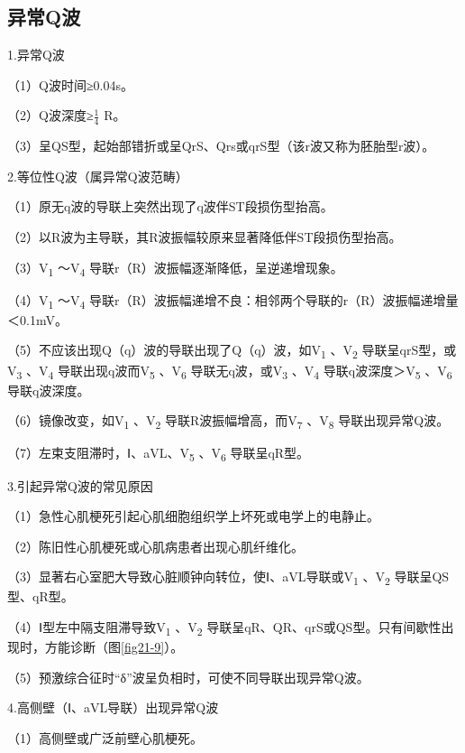 \protect\hypertarget{text00009.htmlux5cux23subid45}{}{}

\subsection{异常Q波}

1.异常Q波

（1）Q波时间≥0.04s。

（2）Q波深度≥$\frac{1}{4}$ R。

（3）呈QS型，起始部错折或呈QrS、Qrs或qrS型（该r波又称为胚胎型r波）。

2.等位性Q波（属异常Q波范畴）

（1）原无q波的导联上突然出现了q波伴ST段损伤型抬高。

（2）以R波为主导联，其R波振幅较原来显著降低伴ST段损伤型抬高。

（3）V\textsubscript{1} ～V\textsubscript{4}
导联r（R）波振幅逐渐降低，呈逆递增现象。

（4）V\textsubscript{1} ～V\textsubscript{4}
导联r（R）波振幅递增不良：相邻两个导联的r（R）波振幅递增量＜0.1mV。

（5）不应该出现Q（q）波的导联出现了Q（q）波，如V\textsubscript{1}
、V\textsubscript{2} 导联呈qrS型，或V\textsubscript{3}
、V\textsubscript{4} 导联出现q波而V\textsubscript{5}
、V\textsubscript{6} 导联无q波，或V\textsubscript{3}
、V\textsubscript{4} 导联q波深度＞V\textsubscript{5}
、V\textsubscript{6} 导联q波深度。

（6）镜像改变，如V\textsubscript{1} 、V\textsubscript{2}
导联R波振幅增高，而V\textsubscript{7} 、V\textsubscript{8}
导联出现异常Q波。

（7）左束支阻滞时，Ⅰ、aVL、V\textsubscript{5} 、V\textsubscript{6}
导联呈qR型。

3.引起异常Q波的常见原因

（1）急性心肌梗死引起心肌细胞组织学上坏死或电学上的电静止。

（2）陈旧性心肌梗死或心肌病患者出现心肌纤维化。

（3）显著右心室肥大导致心脏顺钟向转位，使Ⅰ、aVL导联或V\textsubscript{1}
、V\textsubscript{2} 导联呈QS型、qR型。

（4）Ⅰ型左中隔支阻滞导致V\textsubscript{1} 、V\textsubscript{2}
导联呈qR、QR、qrS或QS型。只有间歇性出现时，方能诊断（图\ref{fig21-9}）。

（5）预激综合征时“δ”波呈负相时，可使不同导联出现异常Q波。

4.高侧壁（Ⅰ、aVL导联）出现异常Q波

（1）高侧壁或广泛前壁心肌梗死。

